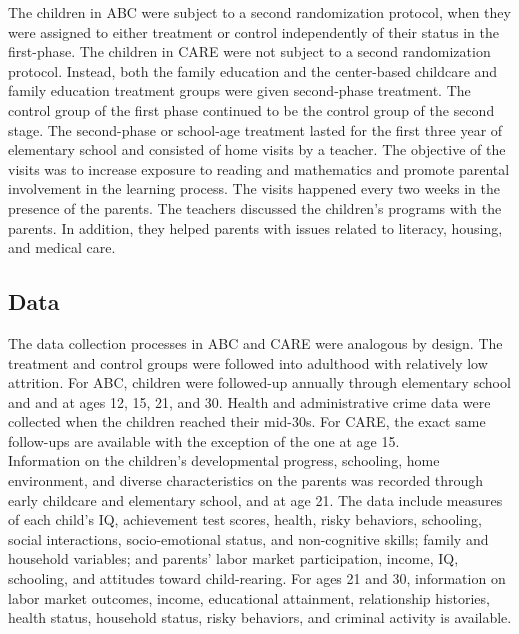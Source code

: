 \noindent The children in ABC were subject to a second randomization protocol, when they were assigned to either treatment or control independently of their status in the first-phase. The children in CARE were not subject to a second randomization protocol. Instead, both the family education and the center-based childcare and family education treatment groups were given second-phase treatment. The control group of the first phase continued to be the control group of the second stage. The second-phase or school-age treatment lasted for the first three year of elementary school and consisted of home visits by a teacher. The objective of the visits was to increase exposure to reading and mathematics and promote parental involvement in the learning process. The visits happened every two weeks in the presence of the parents. The teachers discussed the children's programs with the parents. In addition, they helped parents with issues related to literacy, housing, and medical care.\\ 

\subsection{Data}

\noindent The data collection processes in ABC and CARE were analogous by design. The treatment and control groups were followed into adulthood with relatively low attrition. For ABC, children were followed-up annually through elementary school and and at ages 12, 15, 21, and 30. Health and administrative crime data were collected when the children reached their mid-30s. For CARE, the exact same follow-ups are available with the exception of the one at age 15.\\

\noindent Information on the children’s developmental progress, schooling, home environment, and diverse characteristics on the parents was recorded through early childcare and elementary school, and at age 21. The data include measures of each child’s IQ, achievement test scores, health, risky behaviors, schooling, social interactions, socio-emotional status, and non-cognitive skills; family and household variables; and parents’ labor market participation, income, IQ, schooling, and attitudes toward child-rearing. For ages 21 and 30, information on labor market outcomes, income, educational attainment, relationship histories, health status, household status, risky behaviors, and criminal activity is available.\\

